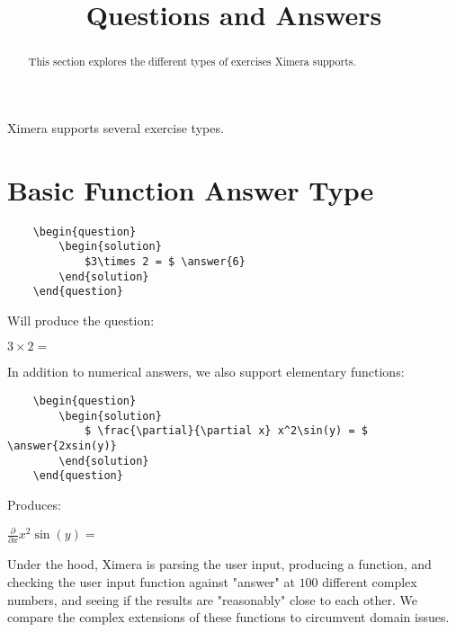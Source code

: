 \documentclass{ximera}
\title{Questions and Answers}
\begin{document}
	\begin{abstract}
		This section explores the different types of exercises Ximera supports. 
	\end{abstract}
	
Ximera supports several exercise types.
	
	
\section{Basic Function Answer Type}	
\begin{verbatim}
    \begin{question}
        \begin{solution}
            $3\times 2 = $ \answer{6}
        \end{solution}
    \end{question}
\end{verbatim}

Will produce the question:

\begin{question}
        \begin{solution}
            $3\times 2 = $ 
        \end{solution}
\end{question}

In addition to numerical answers, we also support elementary functions:

\begin{verbatim}
    \begin{question}
        \begin{solution}
            $ \frac{\partial}{\partial x} x^2\sin(y) = $ \answer{2xsin(y)}
        \end{solution}
    \end{question}
\end{verbatim}

Produces:

  \begin{question}
        \begin{solution}
            $ \frac{\partial}{\partial x} x^2\sin(y) = $ 
        \end{solution}
    \end{question}
    
Under the hood, Ximera is parsing the user input, producing a function, and checking the user input function against "answer" at 
$100$ different complex numbers, and seeing if the results are "reasonably" close to each other.  
We compare the complex extensions of these functions to circumvent domain issues.
\end{document}
